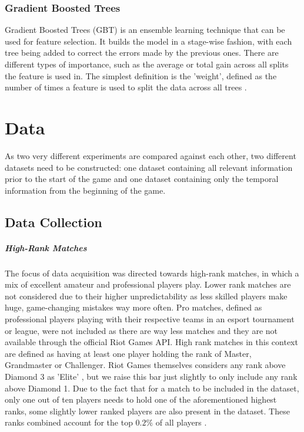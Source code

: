 \documentclass[12pt, a4paper, headinclude, twoside, plainheadsepline, open=right, numbers=noenddot, hidelinks, toc=listof, toc=bibliography]{scrreprt}
\begin{document}
\subsection{Gradient Boosted Trees}
\label{ssec:gbt}

Gradient Boosted Trees (GBT) is an ensemble learning technique that can be used for feature selection. It builds the model in a stage-wise fashion, with each tree being added to correct the errors made by the previous ones. 
There are different types of importance, such as the average or total gain across all splits the feature is used in.
The simplest definition is the 'weight', defined as the number of times a feature is used to split the data across all trees \cite{chenXGBoostScalableTree2016}.



\chapter{Data}
\label{chap:data}

As two very different experiments are compared against each other, two different datasets need to be constructed: one dataset containing all relevant information prior to the start of the game and one dataset containing only the temporal information from the beginning of the game.


\section{Data Collection}
\label{sec:datacoll}

\paragraph{High-Rank Matches}
The focus of data acquisition was directed towards high-rank matches, in which a mix of excellent amateur and professional players play.
Lower rank matches are not considered due to their higher unpredictability as less skilled players make huge, game-changing mistakes way more often.
Pro matches, defined as professional players playing with their respective teams in an esport tournament or league, were not included as there are way less matches and they are not available through the official Riot Games API.
High rank matches in this context are defined as having at least one player holding the rank of Master, Grandmaster or Challenger.
Riot Games themselves considers any rank above Diamond 3 as 'Elite' \cite{riotgamesDevBalanceFramework2020}, but we raise this bar just slightly to only include any rank above Diamond 1.
Due to the fact that for a match to be included in the dataset, only one out of ten players needs to hold one of the aforementioned highest ranks, some slightly lower ranked players are also present in the dataset.
These ranks combined account for the top $0.2\%$ of all players \cite{riotgamesRankedTiersDivisions2023}.
\end{document}
